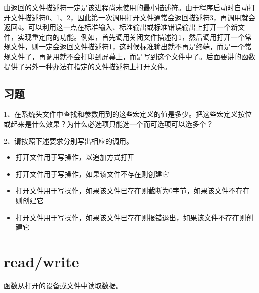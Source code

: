 由返回的文件描述符一定是该进程尚未使用的最小描述符。由于程序启动时自动打开文件描述符0、1、2，因此第一次调用打开文件通常会返回描述符3，再调用就会返回4。可以利用这一点在标准输入、标准输出或标准错误输出上打开一个新文件，实现重定向的功能。例如，首先调用关闭文件描述符1，然后调用打开一个常规文件，则一定会返回文件描述符1，这时候标准输出就不再是终端，而是一个常规文件了，再调用就不会打印到屏幕上，而是写到这个文件中了。后面要讲的函数提供了另外一种办法在指定的文件描述符上打开文件。


\subsection*{习题}
%


1、在系统头文件中查找和参数用到的这些宏定义的值是多少。把这些宏定义按位或起来是什么效果？为什么必选项只能选一个而可选项可以选多个？



2、请按照下述要求分别写出相应的调用。


\begin{itemize}

\item 打开文件用于写操作，以追加方式打开

\item 打开文件用于写操作，如果该文件不存在则创建它

\item 打开文件用于写操作，如果该文件已存在则截断为0字节，如果该文件不存在则创建它

\item 打开文件用于写操作，如果该文件已存在则报错退出，如果该文件不存在则创建它
\end{itemize}




\section{read/write}
%
函数从打开的设备或文件中读取数据。


